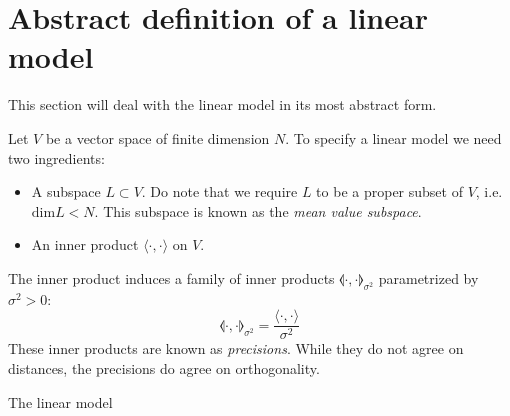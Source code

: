 \documentclass[12pt, a4paper]{article}
\numberwithin{equation}{section}
\begin{document}
\section{Abstract definition of a linear model}
This section will deal with the linear model in its most abstract form.

Let $V$ be a vector space of finite dimension $N$. To specify a linear model we need two ingredients:
\begin{itemize}
\item A subspace $L\subset V$. Do note that we require $L$ to be a proper subset of $V$, i.e. $\textrm{dim}L<N$. This subspace is known as the \textit{mean value subspace}.
\item An inner product $\langle\cdot,\cdot\rangle$ on $V$.
\end{itemize}
The inner product induces a family of inner products $\llangle\cdot,\cdot\rrangle_{\sigma^2}$ parametrized by $\sigma^2>0$:
\begin{equation}
\llangle\cdot,\cdot\rrangle_{\sigma^2}=\frac{\langle\cdot,\cdot\rangle}{\sigma^2}
\end{equation}
These inner products are known as \textit{precisions}. While they do not agree on distances, the precisions do agree on orthogonality.

The linear model
\end{document}
